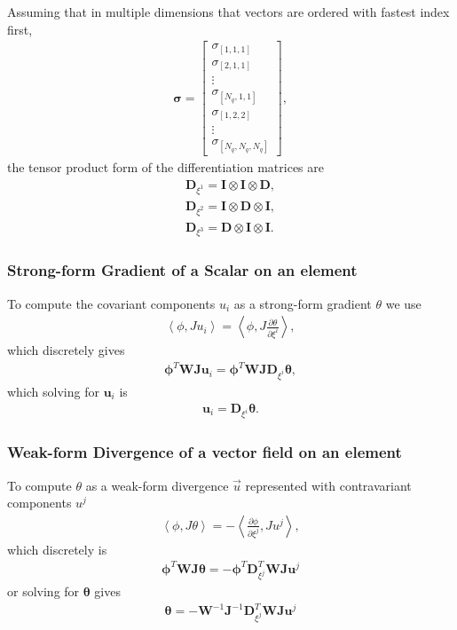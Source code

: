 \documentclass{report}
\newcommand{\inner}[2]{ \left\langle #1, #2 \right\rangle }
\newcommand{\mat}[1]{\boldsymbol #1}
\newcommand{\dvec}[1]{\boldsymbol #1}
\begin{document}
Assuming that in multiple dimensions that vectors are ordered with fastest index first,
\begin{align}
   \dvec{\sigma} =
   \begin{bmatrix}
   \sigma_{[1,1,1]}\\
   \sigma_{[2,1,1]}\\
   \vdots\\
   \sigma_{[N_q, 1, 1]}\\
   \sigma_{[1, 2, 2]}\\
   \vdots\\
   \sigma_{[N_q, N_q, N_q]}
   \end{bmatrix},
\end{align}
the tensor product form of the differentiation matrices are
\begin{align}
    \mat{D}_{\xi^1} = \mat{I} \otimes \mat{I} \otimes \mat{D},\\
    \mat{D}_{\xi^2} = \mat{I} \otimes \mat{D} \otimes \mat{I},\\
    \mat{D}_{\xi^3} = \mat{D} \otimes \mat{I} \otimes \mat{I}.
\end{align}

\subsubsection*{Strong-form Gradient of a Scalar on an element}
To compute the covariant components $u_{i}$ as a strong-form gradient $\theta$ we use
\begin{align}
    \inner{\phi}{J u_{i}} =  \inner{\phi}{J \frac{\partial \theta}{\partial \xi^{i}}},
\end{align}
which discretely gives
\begin{align}
    \dvec{\phi}^{T} \mat{W} \mat{J} \dvec{u}_{i} =   \dvec{\phi}^{T} \mat{W} \mat{J} \mat{D}_{\xi^i} \dvec{\theta},
\end{align}
which solving for $\dvec{u}_{i}$ is
\begin{align}
    \dvec{u}_{i} = \mat{D}_{\xi^i} \dvec{\theta}.
\end{align}

\subsubsection*{Weak-form Divergence of a vector field on an element}
To compute $\theta$ as a weak-form divergence $\vec{u}$ represented with contravariant components $u^j$
\begin{align}
   \inner{\phi}{J \theta}
   =
   -\inner{\frac{\partial \phi}{\partial \xi^j}}{Ju^j},
\end{align}
which discretely is
\begin{align}
   \dvec{\phi}^{T} \mat{W} \mat{J} \dvec{\theta}
   =
   -\dvec{\phi}^{T} \mat{D}_{\xi^j}^{T} \mat{W} \mat{J} \dvec{u^{j}}
\end{align}
or solving for $\dvec{\theta}$ gives
\begin{align}
   \dvec{\theta}
   =
   -\mat{W}^{-1} \mat{J}^{-1} \mat{D}_{\xi^j}^{T} \mat{W} \mat{J} \dvec{u^{j}}
\end{align}
\end{document}

